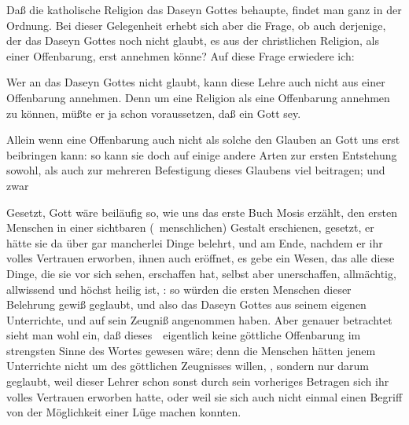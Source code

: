 Daß die katholische Religion das Daseyn Gottes behaupte, findet man ganz in der Ordnung. Bei dieser Gelegenheit erhebt sich aber die Frage, ob auch derjenige, der das Daseyn Gottes noch nicht glaubt, es aus der christlichen Religion, als einer Offenbarung, erst annehmen könne? Auf diese Frage erwiedere ich:
\begin{aufza}
\item Wer an das Daseyn Gottes nicht glaubt, kann diese Lehre auch nicht aus einer Offenbarung  annehmen. Denn um eine Religion als eine Offenbarung annehmen zu können, müßte er ja schon voraussetzen, daß ein Gott sey.
\item Allein wenn eine Offenbarung auch nicht als solche den Glauben an Gott uns erst beibringen kann: so kann sie doch auf einige andere Arten zur ersten Entstehung sowohl, als auch zur mehreren Befestigung dieses Glaubens viel beitragen; und zwar
\begin{aufzb}
\item {} Gesetzt, Gott wäre beiläufig so, wie uns das erste Buch Mosis erzählt, den ersten Menschen in einer sichtbaren (\zB\ menschlichen) Gestalt erschienen, gesetzt, er hätte sie da über gar mancherlei Dinge belehrt, und am Ende, nachdem er ihr volles Vertrauen erworben, ihnen auch eröffnet, es gebe ein Wesen, das alle diese Dinge, die sie vor sich sehen, erschaffen hat, selbst aber unerschaffen, allmächtig, allwissend und höchst heilig ist, \usw : so würden die ersten Menschen dieser Belehrung gewiß geglaubt, und also das Daseyn Gottes aus seinem eigenen Unterrichte, und auf sein Zeugniß angenommen haben. Aber genauer betrachtet sieht man wohl ein, daß dieses~\ eigentlich keine göttliche Offenbarung im strengsten Sinne des Wortes gewesen wäre; denn die Menschen hätten jenem Unterrichte nicht um des göttlichen Zeugnisses willen, , sondern nur darum geglaubt, weil dieser Lehrer schon sonst durch sein vorheriges Betragen sich ihr volles Vertrauen erworben hatte, oder weil sie sich auch nicht einmal einen Begriff von der Möglichkeit einer Lüge machen konnten.

\end{aufzb}
\end{aufza}
